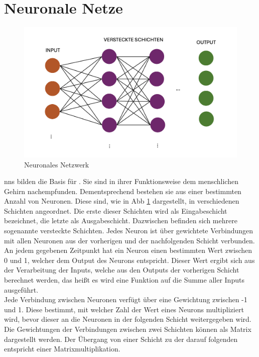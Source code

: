 \documentclass[../main.tex]{subfiles}
\begin{document}
\section{Neuronale Netze}

\begin{figure}[h!]
  \includegraphics[scale=0.6]{bilder/NeuralNetwork.png}
  \caption{Neuronales Netzwerk}
  \label{fig:NN}
\end{figure}
\glspl{nn} bilden die Basis für . Sie sind in ihrer Funktionsweise dem menschlichen Gehirn nachempfunden. Dementsprechend bestehen sie aus einer 
bestimmten Anzahl von Neuronen. Diese sind, wie in Abb \ref{fig:NN} dargestellt, in verschiedenen Schichten angeordnet. Die erste dieser Schichten wird als Eingabeschicht bezeichnet, die letzte als Ausgabeschicht. Dazwischen 
befinden sich mehrere sogenannte versteckte Schichten. Jedes Neuron ist über gewichtete Verbindungen mit allen Neuronen aus der vorherigen und der nachfolgenden Schicht verbunden. 
An jedem gegebenen Zeitpunkt hat ein Neuron einen bestimmten Wert zwischen 0 und 1, welcher dem Output des Neurons entspricht. Dieser Wert ergibt sich aus der Verarbeitung der Inputs, welche 
aus den Outputs der vorherigen Schicht berechnet werden, das heißt es wird eine Funktion auf die Summe aller Inputs ausgeführt. \\
Jede Verbindung zwischen Neuronen verfügt über eine Gewichtung zwischen -1 und 1. Diese bestimmt, mit welcher Zahl der Wert eines Neurons multipliziert wird, bevor dieser an die Neuronen in 
der folgenden Schicht weitergegeben wird. Die Gewichtungen der Verbindungen zwischen zwei Schichten können als Matrix dargestellt werden. Der Übergang von einer 
Schicht zu der darauf folgenden entspricht einer Matrixmultiplikation. \\
\end{document}
